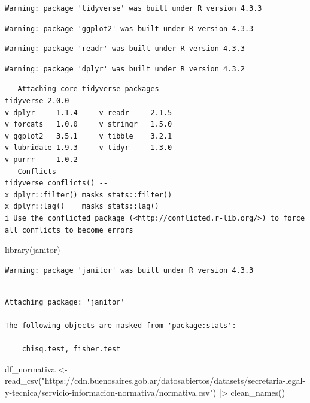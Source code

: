 \documentclass[
  letterpaper,
  DIV=11,
  numbers=noendperiod]{scrreprt}
\newenvironment{Shaded}{\begin{snugshade}}{\end{snugshade}}
\newcommand{\FunctionTok}[1]{\textcolor[rgb]{0.28,0.35,0.67}{#1}}
\newcommand{\NormalTok}[1]{\textcolor[rgb]{0.00,0.23,0.31}{#1}}
\newcommand{\OtherTok}[1]{\textcolor[rgb]{0.00,0.23,0.31}{#1}}
\newcommand{\SpecialCharTok}[1]{\textcolor[rgb]{0.37,0.37,0.37}{#1}}
\newcommand{\StringTok}[1]{\textcolor[rgb]{0.13,0.47,0.30}{#1}}
\begin{document}
\begin{verbatim}
Warning: package 'tidyverse' was built under R version 4.3.3
\end{verbatim}

\begin{verbatim}
Warning: package 'ggplot2' was built under R version 4.3.3
\end{verbatim}

\begin{verbatim}
Warning: package 'readr' was built under R version 4.3.3
\end{verbatim}

\begin{verbatim}
Warning: package 'dplyr' was built under R version 4.3.2
\end{verbatim}

\begin{verbatim}
-- Attaching core tidyverse packages ------------------------ tidyverse 2.0.0 --
v dplyr     1.1.4     v readr     2.1.5
v forcats   1.0.0     v stringr   1.5.0
v ggplot2   3.5.1     v tibble    3.2.1
v lubridate 1.9.3     v tidyr     1.3.0
v purrr     1.0.2     
-- Conflicts ------------------------------------------ tidyverse_conflicts() --
x dplyr::filter() masks stats::filter()
x dplyr::lag()    masks stats::lag()
i Use the conflicted package (<http://conflicted.r-lib.org/>) to force all conflicts to become errors
\end{verbatim}

\begin{Shaded}
\begin{Highlighting}[]
\FunctionTok{library}\NormalTok{(janitor)}
\end{Highlighting}
\end{Shaded}

\begin{verbatim}
Warning: package 'janitor' was built under R version 4.3.3
\end{verbatim}

\begin{verbatim}

Attaching package: 'janitor'

The following objects are masked from 'package:stats':

    chisq.test, fisher.test
\end{verbatim}

\begin{Shaded}
\begin{Highlighting}[]
\NormalTok{df\_normativa }\OtherTok{\textless{}{-}} \FunctionTok{read\_csv}\NormalTok{(}\StringTok{"https://cdn.buenosaires.gob.ar/datosabiertos/datasets/secretaria{-}legal{-}y{-}tecnica/servicio{-}informacion{-}normativa/normativa.csv"}\NormalTok{) }\SpecialCharTok{|\textgreater{}} 
  \FunctionTok{clean\_names}\NormalTok{()}
\end{Highlighting}
\end{Shaded}
\end{document}
